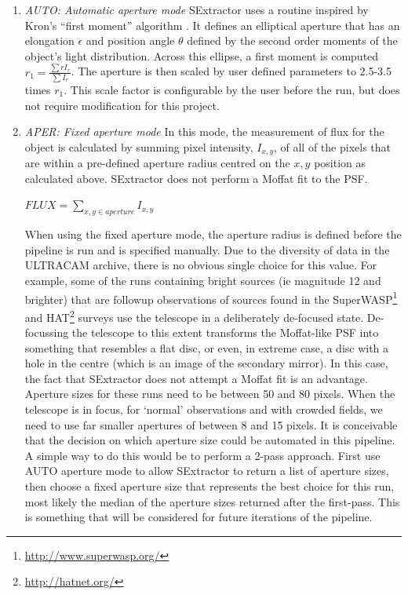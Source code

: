 \begin{enumerate}
  \item \emph{AUTO: Automatic aperture mode}
SExtractor uses a routine inspired by Kron's ``first moment'' algorithm \cite{kron}. It defines an elliptical aperture that has an elongation $\epsilon$ and position angle $\theta$ defined by the second order moments of the object's light distribution. Across this ellipse, a first moment is computed $r_1 = \frac{\sum r I_r}{\sum{I_r}}$. The aperture is then scaled by user defined parameters to 2.5-3.5 times $r_1$. This scale factor is configurable by the user before the run, but does not require modification for this project. 

  \item \emph{APER: Fixed aperture mode}
In this mode, the measurement of flux for the object is calculated by summing pixel intensity, $I_{x,y}$,  of all of the pixels that are within a pre-defined aperture radius centred on the $x, y$ position as calculated above. SExtractor does not perform a Moffat fit to the PSF. 

$FLUX = \sum\limits_{x,y \in aperture}I_{x,y} $

When using the fixed aperture mode, the aperture radius is defined before the pipeline is run and is specified  manually. Due to the diversity of data in the ULTRACAM archive, there is no obvious single choice for this value. For example, some of the runs containing bright sources (ie magnitude 12 and brighter) that are followup observations of sources found in the {SuperWASP}\footnote{\url{http://www.superwasp.org/}} and {HAT}\footnote{\url{http://hatnet.org/}} surveys use the telescope in a deliberately de-focused state. De-focussing the telescope to this extent transforms the Moffat-like PSF into something that resembles a flat disc, or even, in extreme case, a disc with a hole in the centre (which is an image of the secondary mirror). In this case, the fact that SExtractor does not attempt a Moffat fit is an advantage. Aperture sizes for these runs need to be between 50 and 80 pixels. When the telescope is in focus, for `normal' observations and with crowded fields, we need to use far smaller apertures of between 8 and 15 pixels. It is conceivable that the decision on which aperture size could be automated in this pipeline. A simple way to do this would be to perform a 2-pass approach. First use AUTO aperture mode to allow SExtractor to return a list of aperture sizes, then choose a fixed aperture size that represents the best choice for this run, most likely the median of the aperture sizes returned after the first-pass. This is something that will be considered for future iterations of the pipeline. 


\end{enumerate}
